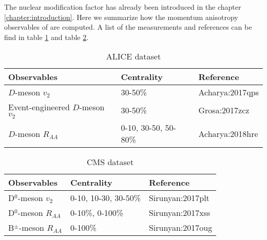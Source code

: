 The nuclear modification factor has already been introduced in the chapter \ref{chapter:introduction}. 
Here we summarize how the momentum anisotropy observables of are computed.
A list of the measurements and references can be find in table \ref{table:ALICE-obs} and table \ref{table:CMS-obs}.
\begin{center}
\begin{table}[h]
\caption{ALICE dataset}\label{table:ALICE-obs} 
\begin{tabularx}{\columnwidth}{XXX}
\hline 
 Observables & Centrality & Reference\\ 
\hline 
$D$-meson $v_2$ & 30-50\% & {Acharya:2017qps}\\ 
\hline 
Event-engineered $D$-meson $v_2$ & 30-50\% & {Grosa:2017zcz}\\ 
\hline 
$D$-meson $R_{AA}$ & 0-10, 30-50, 50-80\% & {Acharya:2018hre}\\
\hline 
\end{tabularx}
\end{table}
\begin{table}[h]
\caption{CMS dataset}\label{table:CMS-obs} 
\begin{tabularx}{\columnwidth}{XXX}
\hline 
Observables & Centrality & Reference\\ 
\hline 
D${}^0$-meson $v_2$ & 0-10, 10-30, 30-50\% & {Sirunyan:2017plt}\\ 
\hline 
D${}^0$-meson $R_{AA}$ & 0-10\%, 0-100\% & {Sirunyan:2017xss}\\ 
\hline 
B${}^{\pm}$-meson $R_{AA}$ & 0-100\% & {Sirunyan:2017oug}\\ 
\hline 
\end{tabularx}
\end{table}
\end{center}

